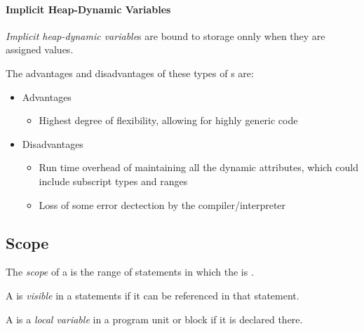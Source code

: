\paragraph{Implicit Heap-Dynamic Variables}\label{par:Implicit_Heap-Dynamic_Variable_Binding_Lifetime}
\begin{definition}\label{def:Implicit_Heap-Dynamic_Variable_Binding_Lifetime}
  \emph{Implicit heap-dynamic variable}s are bound to  storage onnly when they are assigned values.
\end{definition}

The advantages and disadvantages of these types of s are:
\begin{itemize}[noitemsep]
\item Advantages
  \begin{itemize}[noitemsep]
  \item Highest degree of flexibility, allowing for highly generic code
  \end{itemize}
\item Disadvantages
  \begin{itemize}[noitemsep]
  \item Run time overhead of maintaining all the dynamic attributes, which could include subscript types and ranges
  \item Loss of some error dectection by the compiler/interpreter
  \end{itemize}
\end{itemize}

\subsection{Scope}\label{subsec:Variable_Scope}
\begin{definition}[Scope]\label{def:Variable_Scope}
  The \emph{scope} of a  is the range of statements in which the  is .
\end{definition}

\begin{definition}[Visible]\label{def:Visible_Variable}
  A  is \emph{visible} in a statements if it can be referenced in that statement.
\end{definition}

\begin{definition}\label{def:Local_Variable}
  A  is a \emph{local variable} in a program unit or block if it is declared there.
\end{definition}


